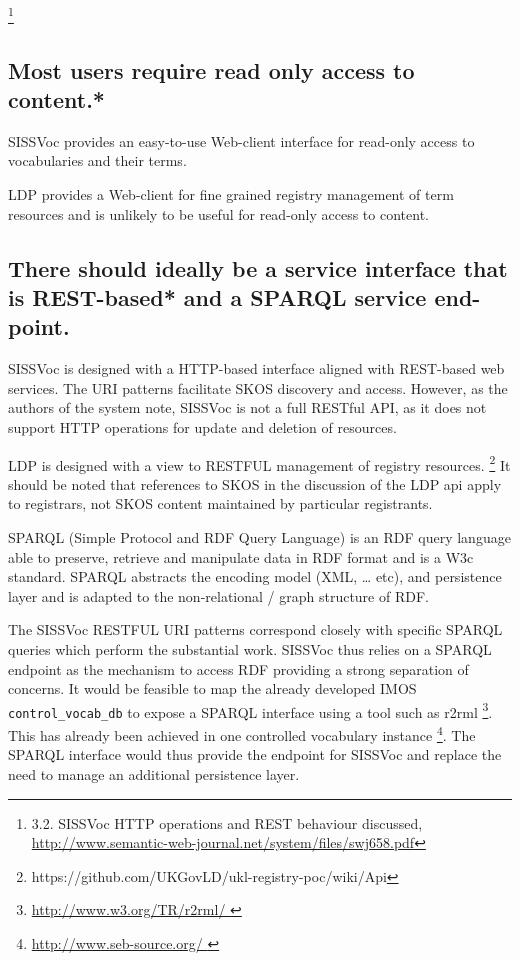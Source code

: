 \documentclass[10pt,a4paper]{article}
\begin{document}
\begin{flushleft}
    \footnote { 3.2. SISSVoc HTTP operations and REST behaviour discussed,
  \url{http://www.semantic-web-journal.net/system/files/swj658.pdf} }


\subsection{ 
  Most users require read only access to content.* 
}
  \item SISSVoc provides an easy-to-use Web-client interface for read-only access to 
  vocabularies and their terms. 
 
  \item LDP provides a Web-client for fine grained registry management of term
resources and is unlikely to be useful for read-only access to content. 


\subsection{ 
  There should ideally be a service interface that is REST-based* and a 
  SPARQL service end-point.
}

     \item SISSVoc is designed with a HTTP-based interface aligned with
  REST-based web services. The URI patterns facilitate SKOS discovery and access.
  However, as the authors of the system note, SISSVoc is not a full RESTful API, as 
  it does not support HTTP operations for update and deletion of resources.
      
    \item  LDP is designed with a view to RESTFUL management of registry
  resources.  \footnote { https://github.com/UKGovLD/ukl-registry-poc/wiki/Api }
  It should be noted that references to SKOS in the discussion of the LDP api
  apply to registrars, not SKOS content maintained by particular registrants.  

      \item SPARQL (Simple Protocol and RDF Query Language) is an RDF query
  language able to preserve, retrieve and manipulate data in RDF format and is a
  W3c standard.  SPARQL abstracts the encoding model (XML, … etc), and
  persistence layer and is adapted to the non-relational / graph structure of
  RDF.

   \item   The SISSVoc RESTFUL URI patterns correspond closely with
  specific SPARQL queries which perform the substantial work. SISSVoc thus relies
  on a SPARQL endpoint as the mechanism to access RDF providing a strong
  separation of concerns. It would be feasible to map the already developed IMOS
  \texttt{control\_vocab\_db} to expose a SPARQL interface using a tool such as
  r2rml \footnote{ \url{ http://www.w3.org/TR/r2rml/ } }. This has already been
  achieved in one controlled vocabulary instance \footnote{ \url{ http://www.seb-source.org/ } }. 
  The SPARQL interface would thus provide the endpoint for SISSVoc and replace the 
  need to manage an additional persistence layer.


\end{flushleft}
\end{document}
